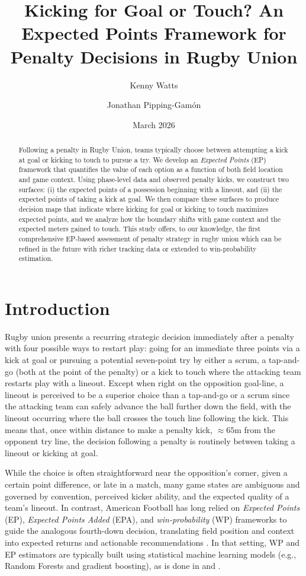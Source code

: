 \documentclass[12pt]{article}
\title{Kicking for Goal or Touch? An Expected Points Framework for Penalty Decisions in Rugby Union}
\author{Kenny Watts}
\author{Jonathan Pipping-Gam\'on}
\affil{\small The Wharton School, University of Pennsylvania}
\date{March 2026}
\begin{document}
\maketitle

\begin{abstract}
Following a penalty in Rugby Union, teams typically choose between attempting a kick at goal or kicking to touch to pursue a try. We develop an \emph{Expected Points} (EP) framework that quantifies the value of each option as a function of both field location and game context. Using phase-level data and observed penalty kicks, we construct two surfaces: (i) the expected points of a possession beginning with a lineout, and (ii) the expected points of taking a kick at goal. We then compare these surfaces to produce decision maps that indicate where kicking for goal or kicking to touch maximizes expected points, and we analyze how the boundary shifts with game context and the expected meters gained to touch. This study offers, to our knowledge, the first comprehensive EP-based assessment of penalty strategy in rugby union which can be refined in the future with richer tracking data or extended to win-probability estimation.
\end{abstract}

\section{Introduction}

Rugby union presents a recurring strategic decision immediately after a penalty with four possible ways to restart play: going for an immediate three points via a kick at goal or pursuing a potential seven-point try by either a scrum, a tap-and-go (both at the point of the penalty) or a kick to touch where the attacking team restarts play with a lineout. Except when right on the opposition goal-line, a lineout is perceived to be a superior choice than a tap-and-go or a scrum since the attacking team can safely advance the ball further down the field, with the lineout occurring where the ball crosses the touch line following the kick. This means that, once within distance to make a penalty kick, $\approx 65\text{m}$ from the opponent try line, the decision following a penalty is routinely between taking a lineout or kicking at goal.

While the choice is often straightforward near the opposition's corner, given a certain point difference, or late in a match, many game states are ambiguous and governed by convention, perceived kicker ability, and the expected quality of a team’s lineout. In contrast, American Football has long relied on \emph{Expected Points} (EP), \emph{Expected Points Added} (EPA), and \emph{win-probability} (WP) frameworks to guide the analogous fourth-down decision, translating field position and context into expected returns and actionable recommendations \citep{Romer2006,Burke2009,YurkoVenturaHorowitz2018}. In that setting, WP and EP estimators are typically built using statistical machine learning models (e.g., Random Forests and gradient boosting), as is done in \cite{LockNettleton2014} and \cite{Baldwin2021}.
\end{document}
